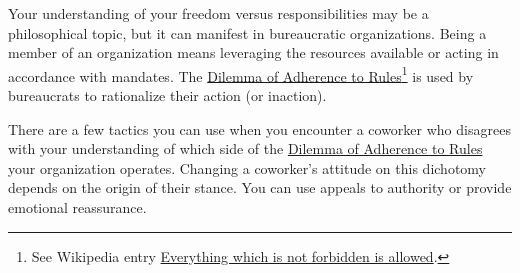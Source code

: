 Your understanding of your freedom versus responsibilities may be a philosophical topic, but it can manifest in bureaucratic organizations. Being a member of an organization means leveraging the resources available or acting in accordance with mandates. 
The \hyperref[table:dilemma-personal-rule-adherence]{Dilemma of Adherence to Rules}\footnote{See Wikipedia entry \href{https://en.wikipedia.org/wiki/Everything_which_is_not_forbidden_is_allowed}{Everything which is not forbidden is allowed}. 
} is used by bureaucrats to rationalize their action (or inaction). 

There are a few tactics you can use when you encounter a coworker who disagrees with your understanding of which side of the \hyperref[table:dilemma-personal-rule-adherence]{Dilemma of Adherence to Rules} your organization operates. 
Changing a coworker's attitude on this dichotomy depends on the origin of their stance. You can use appeals to authority or provide emotional reassurance.



